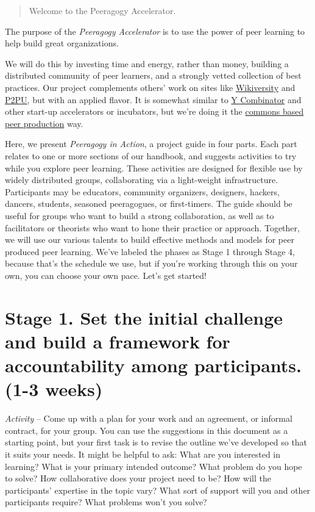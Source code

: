 \begin{quote}
Welcome to the Peeragogy Accelerator.
\end{quote}

The purpose of the \emph{Peeragogy Accelerator} is to use the power of
peer learning to help build great organizations.

We will do this by investing time and energy, rather than money,
building a distributed community of peer learners, and a strongly vetted
collection of best practices. Our project complements others' work on
sites like
\href{https://en.wikiversity.org/wiki/Wikiversity:Main_Page}{Wikiversity}
and \href{https://www.p2pu.org/en/}{P2PU}, but with an applied flavor.
It is somewhat similar to \href{https://www.ycombinator.com/}{Y
Combinator} and other start-up accelerators or incubators, but we're
doing it the
\href{https://en.wikipedia.org/wiki/Commons-based_peer_production}{commons
based peer production} way.

Here, we present \emph{Peeragogy in Action}, a project guide in four
parts. Each part relates to one or more sections of our handbook, and
suggests activities to try while you explore peer learning. These
activities are designed for flexible use by widely distributed groups,
collaborating via a light-weight infrastructure. Participants may be
educators, community organizers, designers, hackers, dancers, students,
seasoned peeragogues, or first-timers. The guide should be useful for
groups who want to build a strong collaboration, as well as to
facilitators or theorists who want to hone their practice or approach.
Together, we will use our various talents to build effective methods and
models for peer produced peer learning. We've labeled the phases as
Stage 1 through Stage 4, because that's the schedule we use, but if
you're working through this on your own, you can choose your own pace.
Let's get started!

\section*{Stage 1. Set the initial challenge and build a framework for
accountability among participants. (1-3
weeks)}\label{stage-1.-set-the-initial-challenge-and-build-a-framework-for-accountability-among-participants.-1-3-weeks}

\emph{Activity} -- Come up with a plan for your work and an agreement,
or informal contract, for your group. You can use the suggestions in
this document as a starting point, but your first task is to revise the
outline we've developed so that it suits your needs. It might be helpful
to ask: What are you interested in learning? What is your primary
intended outcome? What problem do you hope to solve? How collaborative
does your project need to be? How will the participants' expertise in
the topic vary? What sort of support will you and other participants
require? What problems won't you solve?

